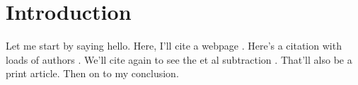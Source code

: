 \documentclass[12pt]{report}
\begin{document}
	\chapter{Introduction}
	Let me start by saying hello. Here, I'll cite a webpage \citep{eure:2009}. Here's a citation with loads of authors \citep{Chang:2008}. We'll cite again to see the et al subtraction \citep{Chang:2008}. That'll also be a print article. Then on to my conclusion.
	\renewcommand{\bibname}{References}
	
	
\end{document}
